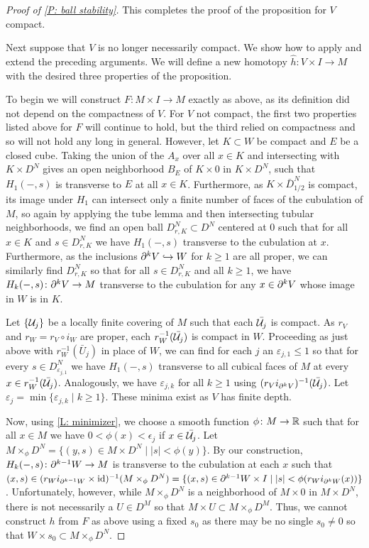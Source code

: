 \begin{proof}[Proof of \cref{P: ball stability}]
This completes the proof of the proposition for $V$ compact.

Next suppose that $V$ is no longer necessarily compact. We show how to apply and extend the preceding arguments. We will define a new homotopy $\hat h \colon V \times I \to M$ with the desired three properties of the proposition.

To begin we will construct $F \colon M \times I \to M$ exactly as above, as its definition did not depend on the compactness of $V$. For $V$ not compact, the first two properties listed above for $F$ will continue to hold, but the third relied on compactness and so will not hold any long in general. However, let
$K \subset W$ be compact and $E$ be a closed cube. Taking the union of the $A_x$ over all $x \in K$ and intersecting with $K \times D^N$ gives an open neighborhood $B_E$ of $K \times 0$ in $K \times D^N$, such that
 $H_1(-,s)$ is transverse to $E$ at all $x \in K$.
Furthermore, as $K \times \bar D^N_{1/2}$ is compact, its image under $H_1$ can intersect only a finite number of faces of the cubulation of $M$, so again by applying the tube lemma and then intersecting tubular neighborhoods, we find an open ball $D_{r,K}^N \subset D^N$ centered at $0$ such that for all $x \in K$ and $s \in D_{r,K}^N$ we have $H_1(-,s)$ transverse to the cubulation at $x$. Furthermore, as the inclusions $\partial^kV \hookrightarrow W$ for $k\geq 1$ are all proper, we can similarly find $D_{r,K}^N$ so that for all $s \in D_{r,K}^N$ and all $k\geq 1$, we have $H_k(-,s) \colon \partial^kV \to M$ transverse to the cubulation for any $x \in \partial^{k}V$ whose image in $W$ is in $K$.

 Let $\{\mathcal{U}_j\}$ be a locally finite covering of $M$ such that each $\bar{\mathcal{U}_j}$ is compact. As $r_V$ and $r_W = r_V \circ i_{W}$ are proper, each $r^{-1}_W(\bar {\mathcal{U}_j})$ is compact in $W$. Proceeding as just above with $r_W^{-1}(\bar U_j)$ in place of $W$, we can find for each $j$ an $\varepsilon_{j,1} \leq 1$ so that for every $s \in D^N_{\varepsilon_{j,1}}$ we have $H_1(-,s)$ transverse to all cubical faces of $M$ at every $x \in r^{-1}_W(\bar {\mathcal{U}_j})$. Analogously, we have $\varepsilon_{j,k}$ for all $k\geq 1$ using $(r_Vi_{\partial^kV})^{-1}(\bar {\mathcal{U}_j})$. Let $\varepsilon_j = \min\{\varepsilon_{j,k} \mid k\geq 1\}$. These minima exist as $V$ has finite depth.

Now, using \cref{L: minimizer}, we choose a smooth function $\phi \colon M \to \mathbb{R}$ such that for all $x \in M$ we have $0<\phi(x)<\epsilon_j$ if $x \in \bar{\mathcal{U}_j}$. Let $M\times_\phi D^N = \{(y,s) \in M \times D^N \mid |s|<\phi(y)\}$. By our construction, $H_k(-,s) \colon \partial^{k-1}W \to M$ is transverse to the cubulation at each $x$ such that $(x,s)\in(r_Wi_{\partial^{k-1}W} \times \mathrm{id})^{-1}(M\times_\phi D^N) = \{(x,s) \in \partial^{k-1}W \times I \mid |s|<\phi(r_Wi_{\partial^kW}(x))\}$. Unfortunately, however, while $M\times_\phi D^N$ is a neighborhood of $M \times 0$ in $M \times D^N$, there is not necessarily a $U \in D^M$ so that $M \times U \subset M\times_\phi D^M$. Thus,
we cannot construct $h$ from $F$ as above using a fixed $s_0$ as there may be no single $s_0\neq 0$ so that $W \times s_0 \subset M\times_\phi D^N$.


\end{proof}
